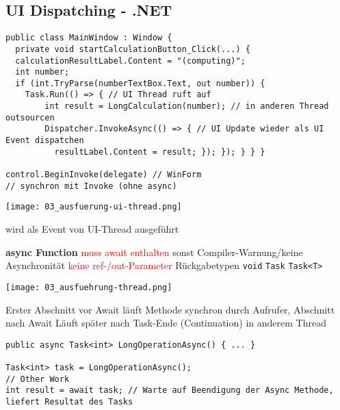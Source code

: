 \subsection{UI Dispatching - .NET}

\begin{lstlisting}
public class MainWindow : Window {
  private void startCalculationButton_Click(...) {
  calculationResultLabel.Content = "(computing)";
  int number;
  if (int.TryParse(numberTextBox.Text, out number)) {
    Task.Run(() => { // UI Thread ruft auf
    	int result = LongCalculation(number); // in anderen Thread outsourcen
    	Dispatcher.InvokeAsync(() => { // UI Update wieder als UI Event dispatchen
    	  resultLabel.Content = result; }); }); } } }

control.BeginInvoke(delegate) // WinForm
// synchron mit Invoke (ohne async)
\end{lstlisting}

\texttt{[image: 03\_ausfuerung-ui-thread.png]}

wird als Event von UI-Thread ausgeführt


\textbf{async Function} \textcolor{red}{muss await enthalten} sonst Compiler-Warnung/keine Asynchronität \textcolor{red}{keine ref-/out-Parameter} Rückgabetypen \lstinline{void} \lstinline{Task} \lstinline{Task<T>}

\texttt{[image: 03\_ausfuehrung-thread.png]}

Erster Abschnitt vor Await läuft Methode synchron durch Aufrufer, Abschnitt nach Await Läuft später nach Task-Ende (Continuation) in anderem Thread



\begin{lstlisting}
public async Task<int> LongOperationAsync() { ... }

Task<int> task = LongOperationAsync();
// Other Work
int result = await task; // Warte auf Beendigung der Async Methode, liefert Resultat des Tasks
\end{lstlisting}
